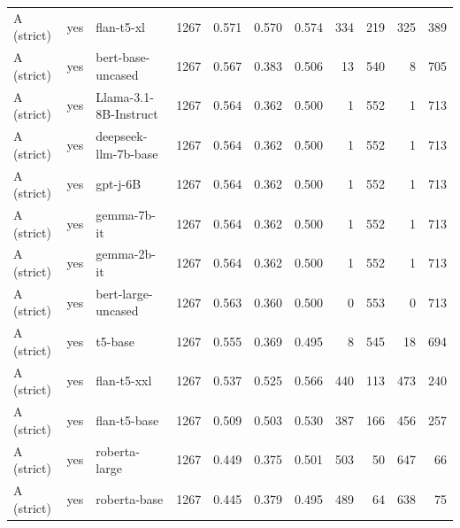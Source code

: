\begin{landscape}
\begin{longtable}{lllc r r r r r r r}
\midrule
A (strict) & yes & flan-t5-xl            & 1267 & 0.571 & 0.570 & 0.574 & 334 & 219 & 325 & 389 \\
A (strict) & yes & bert-base-uncased     & 1267 & 0.567 & 0.383 & 0.506 &  13 & 540 &   8 & 705 \\
A (strict) & yes & Llama-3.1-8B-Instruct & 1267 & 0.564 & 0.362 & 0.500 &   1 & 552 &   1 & 713 \\
A (strict) & yes & deepseek-llm-7b-base  & 1267 & 0.564 & 0.362 & 0.500 &   1 & 552 &   1 & 713 \\
A (strict) & yes & gpt-j-6B              & 1267 & 0.564 & 0.362 & 0.500 &   1 & 552 &   1 & 713 \\
A (strict) & yes & gemma-7b-it           & 1267 & 0.564 & 0.362 & 0.500 &   1 & 552 &   1 & 713 \\
A (strict) & yes & gemma-2b-it           & 1267 & 0.564 & 0.362 & 0.500 &   1 & 552 &   1 & 713 \\
A (strict) & yes & bert-large-uncased    & 1267 & 0.563 & 0.360 & 0.500 &   0 & 553 &   0 & 713 \\
A (strict) & yes & t5-base               & 1267 & 0.555 & 0.369 & 0.495 &   8 & 545 &  18 & 694 \\
A (strict) & yes & flan-t5-xxl           & 1267 & 0.537 & 0.525 & 0.566 & 440 & 113 & 473 & 240 \\
A (strict) & yes & flan-t5-base          & 1267 & 0.509 & 0.503 & 0.530 & 387 & 166 & 456 & 257 \\
A (strict) & yes & roberta-large         & 1267 & 0.449 & 0.375 & 0.501 & 503 &  50 & 647 &  66 \\
A (strict) & yes & roberta-base          & 1267 & 0.445 & 0.379 & 0.495 & 489 &  64 & 638 &  75 \\


\end{longtable}
\end{landscape}
